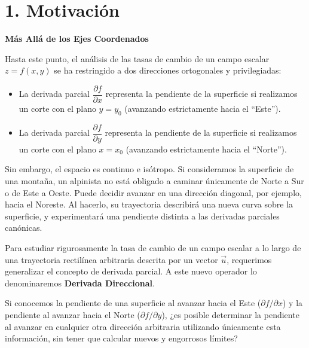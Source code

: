 \documentclass[11pt]{article}
\newenvironment{motivacion}{%
  \section*{1. Motivación}%
}{}
\newenvironment{preguntaguia}{%
  \begin{tcolorbox}[colback=cyan!5,colframe=cyan!75!black,title=Pregunta Guía]%
}{%
  \end{tcolorbox}%
}
\begin{document}
\begin{motivacion}
  \textbf{Más Allá de los Ejes Coordenados}

  Hasta este punto, el análisis de las tasas de cambio de un campo escalar $z = f(x,y)$ se ha restringido a dos direcciones ortogonales y privilegiadas:
  \begin{itemize}
    \item La derivada parcial $\dfrac{\partial f}{\partial x}$ representa la pendiente de la superficie si realizamos un corte con el plano $y = y_0$ (avanzando estrictamente hacia el ``Este'').
    \item La derivada parcial $\dfrac{\partial f}{\partial y}$ representa la pendiente de la superficie si realizamos un corte con el plano $x = x_0$ (avanzando estrictamente hacia el ``Norte'').
  \end{itemize}

  Sin embargo, el espacio es continuo e isótropo. Si consideramos la superficie de una montaña, un alpinista no está obligado a caminar únicamente de Norte a Sur o de Este a Oeste. Puede decidir avanzar en una dirección diagonal, por ejemplo, hacia el Noreste. Al hacerlo, su trayectoria describirá una nueva curva sobre la superficie, y experimentará una pendiente distinta a las derivadas parciales canónicas.

  Para estudiar rigurosamente la tasa de cambio de un campo escalar a lo largo de una trayectoria rectilínea arbitraria descrita por un vector $\vec{u}$, requerimos generalizar el concepto de derivada parcial. A este nuevo operador lo denominaremos \textbf{Derivada Direccional}.

  \begin{preguntaguia}
    Si conocemos la pendiente de una superficie al avanzar hacia el Este ($\partial f/\partial x$) y la pendiente al avanzar hacia el Norte ($\partial f/\partial y$), ¿es posible determinar la pendiente al avanzar en cualquier otra dirección arbitraria utilizando únicamente esta información, sin tener que calcular nuevos y engorrosos límites?
  \end{preguntaguia}
\end{motivacion}
\end{document}
